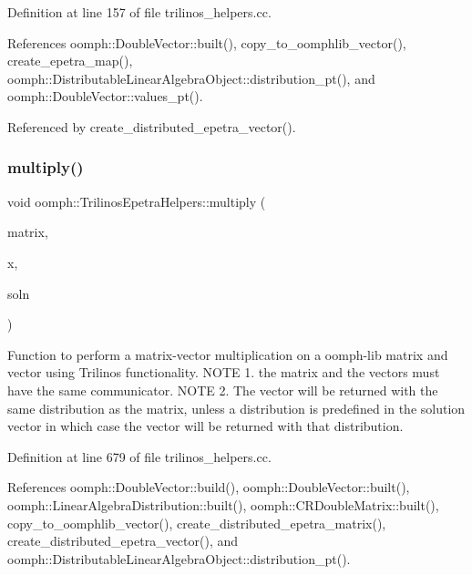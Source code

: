Definition at line 157 of file trilinos\+\_\+helpers.\+cc.



References oomph\+::\+Double\+Vector\+::built(), copy\+\_\+to\+\_\+oomphlib\+\_\+vector(), create\+\_\+epetra\+\_\+map(), oomph\+::\+Distributable\+Linear\+Algebra\+Object\+::distribution\+\_\+pt(), and oomph\+::\+Double\+Vector\+::values\+\_\+pt().



Referenced by create\+\_\+distributed\+\_\+epetra\+\_\+vector().

\mbox{\label{namespaceoomph_1_1TrilinosEpetraHelpers_a595c337ff02ad53b3dcac04ed142f8db}} 
\subsubsection{\texorpdfstring{multiply()}{multiply()}\hspace{0.1cm}{\footnotesize\ttfamily [1/2]}}
{\footnotesize\ttfamily void oomph\+::\+Trilinos\+Epetra\+Helpers\+::multiply (\begin{DoxyParamCaption}\item[{const \hyperlink{classoomph_1_1CRDoubleMatrix}{C\+R\+Double\+Matrix} $\ast$}]{matrix,  }\item[{const \hyperlink{classoomph_1_1DoubleVector}{Double\+Vector} \&}]{x,  }\item[{\hyperlink{classoomph_1_1DoubleVector}{Double\+Vector} \&}]{soln }\end{DoxyParamCaption})}



Function to perform a matrix-\/vector multiplication on a oomph-\/lib matrix and vector using Trilinos functionality. N\+O\+TE 1. the matrix and the vectors must have the same communicator. N\+O\+TE 2. The vector will be returned with the same distribution as the matrix, unless a distribution is predefined in the solution vector in which case the vector will be returned with that distribution. 



Definition at line 679 of file trilinos\+\_\+helpers.\+cc.



References oomph\+::\+Double\+Vector\+::build(), oomph\+::\+Double\+Vector\+::built(), oomph\+::\+Linear\+Algebra\+Distribution\+::built(), oomph\+::\+C\+R\+Double\+Matrix\+::built(), copy\+\_\+to\+\_\+oomphlib\+\_\+vector(), create\+\_\+distributed\+\_\+epetra\+\_\+matrix(), create\+\_\+distributed\+\_\+epetra\+\_\+vector(), and oomph\+::\+Distributable\+Linear\+Algebra\+Object\+::distribution\+\_\+pt().



